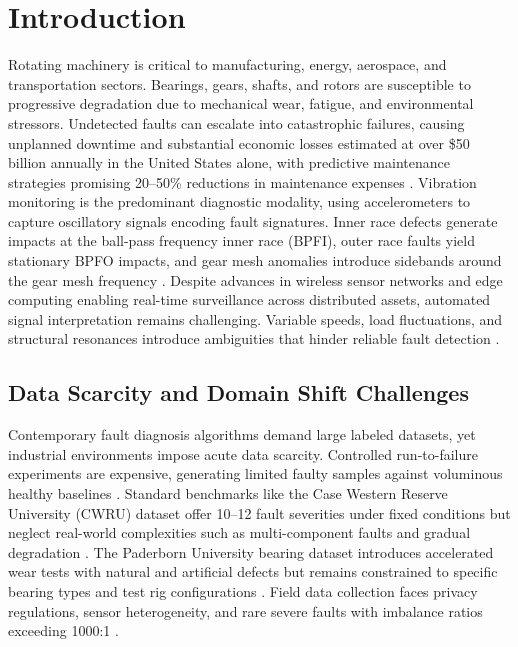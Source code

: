\section{Introduction}

Rotating machinery is critical to manufacturing, energy, aerospace, and transportation sectors. Bearings, gears, shafts, and rotors are susceptible to progressive degradation due to mechanical wear, fatigue, and environmental stressors. Undetected faults can escalate into catastrophic failures, causing unplanned downtime and substantial economic losses estimated at over \$50 billion annually in the United States alone, with predictive maintenance strategies promising 20--50\% reductions in maintenance expenses \cite{cite1}\cite{cite22}. Vibration monitoring is the predominant diagnostic modality, using accelerometers to capture oscillatory signals encoding fault signatures. Inner race defects generate impacts at the ball-pass frequency inner race (BPFI), outer race faults yield stationary BPFO impacts, and gear mesh anomalies introduce sidebands around the gear mesh frequency \cite{cite2}\cite{cite3}. Despite advances in wireless sensor networks and edge computing enabling real-time surveillance across distributed assets, automated signal interpretation remains challenging. Variable speeds, load fluctuations, and structural resonances introduce ambiguities that hinder reliable fault detection \cite{cite4}.

\subsection{Data Scarcity and Domain Shift Challenges}

Contemporary fault diagnosis algorithms demand large labeled datasets, yet industrial environments impose acute data scarcity. Controlled run-to-failure experiments are expensive, generating limited faulty samples against voluminous healthy baselines \cite{cite5}. Standard benchmarks like the Case Western Reserve University (CWRU) dataset offer 10--12 fault severities under fixed conditions but neglect real-world complexities such as multi-component faults and gradual degradation \cite{cite6}. The Paderborn University bearing dataset introduces accelerated wear tests with natural and artificial defects but remains constrained to specific bearing types and test rig configurations \cite{cite7}. Field data collection faces privacy regulations, sensor heterogeneity, and rare severe faults with imbalance ratios exceeding 1000:1 \cite{cite8}.

